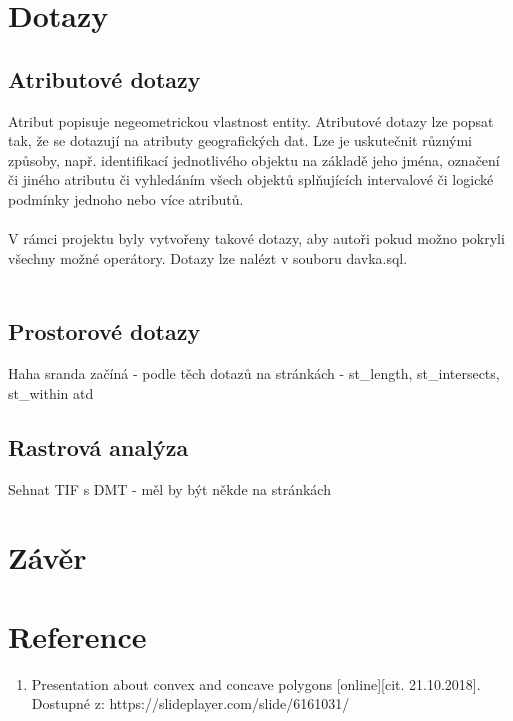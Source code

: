 \documentclass[a4paper, 12pt]{article}
\begin{document}
\section{Dotazy}

\subsection{Atributové dotazy}
Atribut popisuje negeometrickou vlastnost entity. Atributové dotazy lze popsat tak, že se dotazují na atributy geografických dat. Lze je uskutečnit různými způsoby, např. identifikací jednotlivého objektu na základě jeho jména, označení či jiného atributu či vyhledáním všech objektů splňujících intervalové či logické podmínky jednoho nebo více atributů. \\
\\
V rámci projektu byly vytvořeny takové dotazy, aby autoři pokud možno pokryli všechny možné operátory. Dotazy lze nalézt v souboru davka.sql.  \\
\\



\subsection{Prostorové dotazy}
Haha sranda začíná - podle těch dotazů na stránkách - st\_length, st\_intersects, st\_within atd


\subsection{Rastrová analýza}
Sehnat TIF s DMT - měl by být někde na stránkách



\section{Závěr}

\clearpage
\section{Reference}

\begin{enumerate}
\item  Presentation about convex and concave polygons [online][cit. 21.10.2018]. \\
Dostupné z: https://slideplayer.com/slide/6161031/  \\


\end{enumerate}
\end{document}
